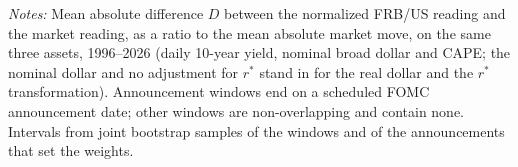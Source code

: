 \begin{table}[tbp]\centering\small
\caption{The Difference Between the Readings on Announcement Days and Other Days}\label{tab:daily}
\begin{flushleft}\footnotesize\textit{Notes:} Mean absolute difference $D$ between the normalized FRB/US reading and the market reading, as a ratio to the mean absolute market move, on the same three assets, 1996--2026 (daily 10-year yield, nominal broad dollar and CAPE; the nominal dollar and no adjustment for $r^*$ stand in for the real dollar and the $r^*$ transformation). Announcement windows end on a scheduled FOMC announcement date; other windows are non-overlapping and contain none. Intervals from joint bootstrap samples of the windows and of the announcements that set the weights.\end{flushleft}
\end{table}
